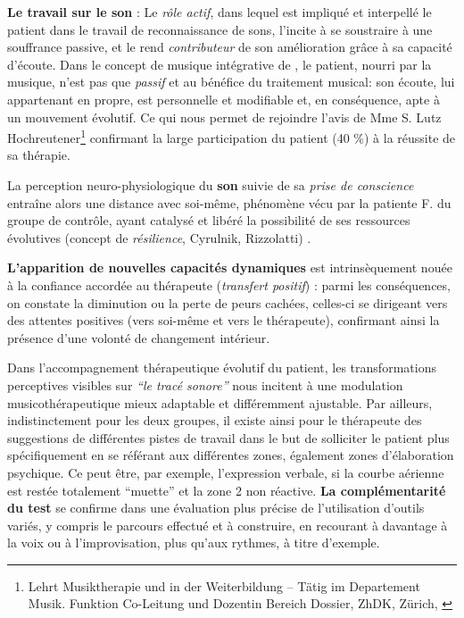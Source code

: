 \begin{itemize}
 \textbf{Le travail sur le son} :
Le \emph{rôle actif}, dans lequel est impliqué et interpellé le patient dans le travail
de reconnaissance de sons, l'incite à se soustraire à une souffrance
passive, et  le rend  \textit{contributeur} de son amélioration grâce à sa capacité
d'écoute.
Dans le concept de musique intégrative de \autocite[Cf.]
{vrait_musicotherapie_2018},  le patient, nourri par
la musique, n'est pas que \textit{passif }et
au bénéfice  du traitement musical: son écoute, lui
appartenant en propre, est personnelle et modifiable %
et, en conséquence, apte à un mouvement évolutif.
Ce qui nous permet de rejoindre l'avis de Mme S. Lutz
Hochreutener\footnote{Lehrt Musiktherapie und in der Weiterbildung – Tätig
	im Departement Musik. Funktion Co-Leitung und Dozentin Bereich
	Dossier, ZhDK, Zürich, \autocite {lutz_hochreutener_spiel_2009} }
confirmant la large participation du patient (40 \%) à la réussite de sa thérapie.


La  perception
neuro-physiologique du \textbf{son} suivie de sa
\textit{prise de conscience }
entraîne alors une distance avec
soi-même, phénomène vécu  par 
la  patiente F.  du groupe de contrôle, ayant catalysé et libéré
la possibilité de ses ressources évolutives (concept de \textit{résilience}, Cyrulnik, Rizzolatti) 
\autocite[27--63]{van_eersel_cerveau}.


 \textbf{L'apparition de nouvelles
	capacités  dynamiques }est intrinsèquement nouée à la confiance
accordée au thérapeute (\textit{transfert positif})
\autocite{roustang1986} : parmi les conséquences, on constate la
diminution ou la perte de peurs cachées, celles-ci se dirigeant vers des
attentes positives (vers soi-même et vers le thérapeute), confirmant ainsi la
présence d'une volonté de changement intérieur.



Dans l'accompagnement thérapeutique évolutif du patient,
les transformations perceptives visibles sur
\textit{``le tracé sonore''} nous incitent à une modulation
musicothérapeutique mieux adaptable et différemment ajustable.
Par ailleurs, indistinctement pour les deux
groupes, il existe ainsi pour le thérapeute des
suggestions de différentes pistes de travail dans le but de
solliciter le patient plus spécifiquement en se référant aux
différentes zones, également zones
d'élaboration psychique. Ce peut être, par exemple,
l'expression verbale, si la courbe aérienne est restée
totalement ``muette'' et la zone 2 non
réactive.
 \textbf{La complémentarité du test} se confirme dans une évaluation plus
précise de l'utilisation d'outils variés, y compris  le parcours effectué et à
construire, en recourant à davantage  à la voix ou à l'improvisation,
plus qu'aux rythmes, à titre d'exemple.


\end{itemize}
